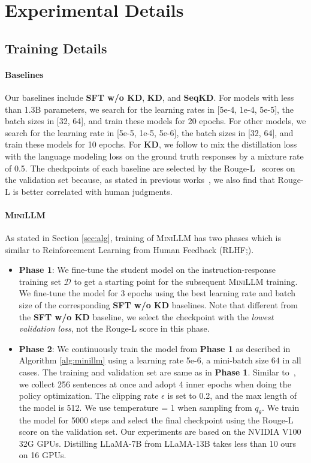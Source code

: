 \documentclass{article}
\def\ps{q_\theta}
\begin{document}
\section{Experimental Details}

\subsection{Training Details}
\label{app:training_detail}
\paragraph{Baselines} Our baselines include \textbf{SFT w/o KD}, \textbf{KD}, and \textbf{SeqKD}. For models with less than 1.3B parameters, we search for the learning rates in [5e-4, 1e-4, 5e-5], the batch sizes in [32, 64], and train these models for 20 epochs. For other models, we search for the learning rate in [5e-5, 1e-5, 5e-6], the batch sizes in [32, 64], and train these models for 10 epochs.
For \textbf{KD}, we follow \cite{lightpaff} to mix the distillation loss with the language modeling loss on the ground truth responses by a mixture rate of 0.5. The checkpoints of each baseline are selected by the Rouge-L~\citep{rouge} scores on the validation set because, as stated in previous works~\citep{super-natural-instructions,instruct-gpt}, we also find that Rouge-L is better correlated with human judgments.

\paragraph{\textsc{MiniLLM}} As stated in Section \ref{sec:alg}, training of \textsc{MiniLLM} has two phases which is similar to Reinforcement Learning from Human Feedback (RLHF;\citealp{instruct-gpt}).
\begin{itemize}[leftmargin=12pt,noitemsep,topsep=-3pt]
    \item \textbf{Phase 1}: We fine-tune the student model on the instruction-response training set $\mathcal{D}$ to get a starting point for the subsequent \textsc{MiniLLM} training. We fine-tune the model for 3 epochs using the best learning rate and batch size of the corresponding \textbf{SFT w/o KD} baselines. Note that different from the \textbf{SFT w/o KD} baseline, we select the checkpoint with the \textit{lowest validation loss}, not the Rouge-L score in this phase.
    \item \textbf{Phase 2}: We continuously train the model from \textbf{Phase 1} as described in Algorithm \ref{alg:minillm} using a learning rate 5e-6, a mini-batch size $64$ in all cases. The training and validation set are same as in \textbf{Phase 1}. Similar to~\cite{instruct-gpt}, we collect 256 sentences at once and adopt 4 inner epochs when doing the policy optimization. The clipping rate $\epsilon$ is set to 0.2, and the max length of the model is 512. We use temperature = 1 when sampling from $\ps$. We train the model for 5000 steps and select the final checkpoint using the Rouge-L score on the validation set. Our experiments are based on the NVIDIA V100 32G GPUs. Distilling LLaMA-7B from LLaMA-13B takes less than 10 ours on 16 GPUs.
\end{itemize}
\end{document}
